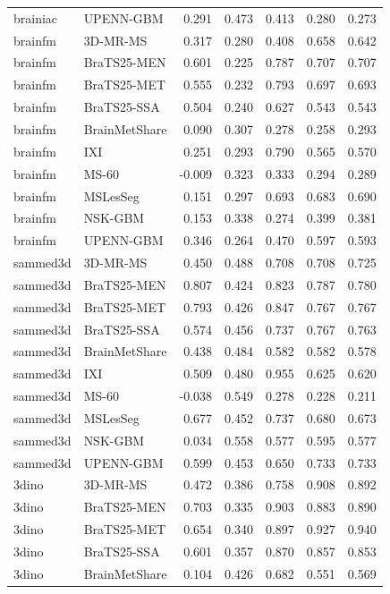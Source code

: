 \begin{tabular}{llrrrrr}
brainiac & UPENN-GBM & 0.291 & 0.473 & 0.413 & 0.280 & 0.273 \\
brainfm & 3D-MR-MS & 0.317 & 0.280 & 0.408 & 0.658 & 0.642 \\
brainfm & BraTS25-MEN & 0.601 & 0.225 & 0.787 & 0.707 & 0.707 \\
brainfm & BraTS25-MET & 0.555 & 0.232 & 0.793 & 0.697 & 0.693 \\
brainfm & BraTS25-SSA & 0.504 & 0.240 & 0.627 & 0.543 & 0.543 \\
brainfm & BrainMetShare & 0.090 & 0.307 & 0.278 & 0.258 & 0.293 \\
brainfm & IXI & 0.251 & 0.293 & 0.790 & 0.565 & 0.570 \\
brainfm & MS-60 & -0.009 & 0.323 & 0.333 & 0.294 & 0.289 \\
brainfm & MSLesSeg & 0.151 & 0.297 & 0.693 & 0.683 & 0.690 \\
brainfm & NSK-GBM & 0.153 & 0.338 & 0.274 & 0.399 & 0.381 \\
brainfm & UPENN-GBM & 0.346 & 0.264 & 0.470 & 0.597 & 0.593 \\
sammed3d & 3D-MR-MS & 0.450 & 0.488 & 0.708 & 0.708 & 0.725 \\
sammed3d & BraTS25-MEN & 0.807 & 0.424 & 0.823 & 0.787 & 0.780 \\
sammed3d & BraTS25-MET & 0.793 & 0.426 & 0.847 & 0.767 & 0.767 \\
sammed3d & BraTS25-SSA & 0.574 & 0.456 & 0.737 & 0.767 & 0.763 \\
sammed3d & BrainMetShare & 0.438 & 0.484 & 0.582 & 0.582 & 0.578 \\
sammed3d & IXI & 0.509 & 0.480 & 0.955 & 0.625 & 0.620 \\
sammed3d & MS-60 & -0.038 & 0.549 & 0.278 & 0.228 & 0.211 \\
sammed3d & MSLesSeg & 0.677 & 0.452 & 0.737 & 0.680 & 0.673 \\
sammed3d & NSK-GBM & 0.034 & 0.558 & 0.577 & 0.595 & 0.577 \\
sammed3d & UPENN-GBM & 0.599 & 0.453 & 0.650 & 0.733 & 0.733 \\
3dino & 3D-MR-MS & 0.472 & 0.386 & 0.758 & 0.908 & 0.892 \\
3dino & BraTS25-MEN & 0.703 & 0.335 & 0.903 & 0.883 & 0.890 \\
3dino & BraTS25-MET & 0.654 & 0.340 & 0.897 & 0.927 & 0.940 \\
3dino & BraTS25-SSA & 0.601 & 0.357 & 0.870 & 0.857 & 0.853 \\
3dino & BrainMetShare & 0.104 & 0.426 & 0.682 & 0.551 & 0.569 \\

\end{tabular}
